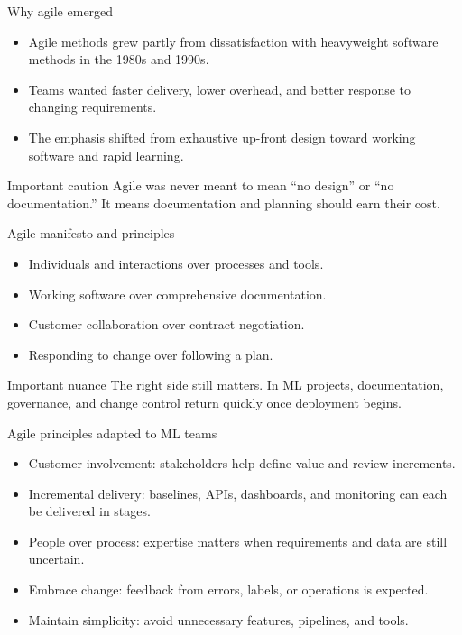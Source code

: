 \begin{frame}{Why agile emerged}
\begin{itemize}
\item Agile methods grew partly from dissatisfaction with heavyweight software methods in the 1980s and 1990s.
\item Teams wanted faster delivery, lower overhead, and better response to changing requirements.
\item The emphasis shifted from exhaustive up-front design toward working software and rapid learning.
\end{itemize}
\begin{block}{Important caution}
Agile was never meant to mean ``no design'' or ``no documentation.'' It means documentation and planning should earn their cost.
\end{block}
\coursefooter
\end{frame}

\begin{frame}{Agile manifesto and principles}
\begin{itemize}
\item Individuals and interactions over processes and tools.
\item Working software over comprehensive documentation.
\item Customer collaboration over contract negotiation.
\item Responding to change over following a plan.
\end{itemize}
\begin{block}{Important nuance}
The right side still matters. In ML projects, documentation, governance, and change control return quickly once deployment begins.
\end{block}
\coursefooter
\end{frame}

\begin{frame}{Agile principles adapted to ML teams}
\begin{itemize}
\item Customer involvement: stakeholders help define value and review increments.
\item Incremental delivery: baselines, APIs, dashboards, and monitoring can each be delivered in stages.
\item People over process: expertise matters when requirements and data are still uncertain.
\item Embrace change: feedback from errors, labels, or operations is expected.
\item Maintain simplicity: avoid unnecessary features, pipelines, and tools.
\end{itemize}
\coursefooter
\end{frame}

